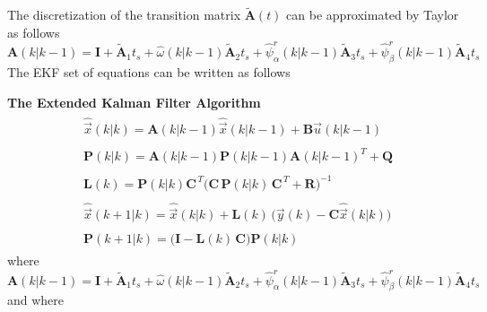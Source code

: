 \documentclass[11pt,a4paper]{scrartcl}
\numberwithin{equation}{section}
\theoremstyle{it}
\theoremstyle{definition}
\begin{document}
\begin{onehalfspace}
The discretization of the transition matrix $\tilde{\mathbf{A}}(t)$ can be 
approximated by Taylor as follows
\begin{equation}\label{pmsm_problem_1_eq_12}
	{\mathbf{A}}(k|k-1) = \mathbf{I} + \tilde{\mathbf{A}}_1t_s + 
	\hat{\omega}(k|k-1) \tilde{\mathbf{A}}_2t_s + \hat{\psi}_\alpha^r(k|k-1) 
	\tilde{\mathbf{A}}_3t_s + \hat{\psi}_\beta^r(k|k-1) \tilde{\mathbf{A}}_4t_s
\end{equation}
The EKF set of equations can be written as follows
\begin{mybox}
	\noindent\textbf{The Extended Kalman Filter Algorithm}
	\begin{align}\label{pmsm_problem_1_eq_13}
		\begin{split}
			&\hat{\vec{x}}\left(k|k\right) = \mathbf{A}(k|k-1) 
			\hat{\vec{x}}\left(k|k-1\right) + \mathbf{B} 
			\vec{u}\left(k|k-1\right)
		\end{split} \\[8pt]
		\begin{split}
			&\mathbf{P}\left(k|k\right) = 
			\mathbf{A}(k|k-1)\mathbf{P}\left(k|k-1\right) \mathbf{A}(k|k-1)^T + 
			\mathbf{Q} 
		\end{split}\\[8pt]
		\begin{split}
			&\mathbf{L}(k) = \mathbf{P}(k|k)\mathbf{C}^{\,T} 
			\Big(\mathbf{C}\,\mathbf{P}(k|k)\,\mathbf{C}^{\,T} 
			+\mathbf{R}\Big)^{-1}
		\end{split}\\[8pt]
		\begin{split}
			&\hat{\vec{x}}\left(k+1|k\right) = \hat{\vec{x}}\left(k|k\right) + 
			\mathbf{L}(k)\, \Big(\vec{y}(k) - 
			\mathbf{C}\hat{\vec{x}}\left(k|k\right)\Big)
		\end{split}\\[8pt]
		\begin{split}
			&\mathbf{P}\left(k+1|k\right) = 
			\Big(\mathbf{I}-\mathbf{L}(k)\,\mathbf{C} \Big) 
			\mathbf{P}\left(k|k\right) 
		\end{split}
	\end{align} 
	where
	\begin{equation}\label{pmsm_problem_1_eq_14}
		{\mathbf{A}}(k|k-1) = \mathbf{I} + \tilde{\mathbf{A}}_1t_s + 
		\hat{\omega}(k|k-1) \tilde{\mathbf{A}}_2t_s + \hat{\psi}_\alpha^r(k|k-1) 
		\tilde{\mathbf{A}}_3t_s + \hat{\psi}_\beta^r(k|k-1) \tilde{\mathbf{A}}_4t_s
	\end{equation}
	and where
	\begin{equation}\label{pmsm_problem_1_eq_15}

\end{equation}
\end{mybox}
\end{onehalfspace}
\end{document}
